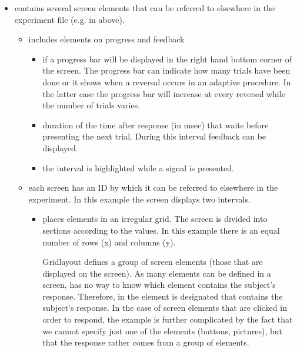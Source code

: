 \begin{itemize}
\item {} contains several screen elements that can
be referred to elsewhere in the experiment file (e.g. in
 above).

\begin{itemize}
\item {} includes elements on progress and
feedback

\begin{itemize}

\item {} if  a progress bar will be
displayed in the right hand bottom corner of the screen. The
progress bar can indicate how many trials have been done or it
shows when a reversal occurs in an adaptive procedure. In the
latter case the progress bar will increase at every reversal while
the number of trials varies.

\item {} duration of the time after
response (in msec) that \apex waits before presenting the next
trial. During this interval feedback can be displayed.

\item {} the interval is highlighted while a
signal is presented.
\end{itemize}

\item {} each screen has an ID by which it can be
referred to elsewhere in the experiment. In this example the
screen displays two intervals.

\begin{itemize}


\item {}places elements in an irregular grid.
The screen is divided into sections according to the values. In
this example there is an equal number of rows (x) and columns (y).

Gridlayout defines a group of screen elements (those that are
displayed on the screen). As many elements can be defined in a
screen, \apex has no way to know which element contains the
subject's response. Therefore, in 
the element is designated that contains the subject's response. In
the case of screen elements that are clicked in order to respond,
the example is further complicated by the fact that we cannot
specify just one of the elements (buttons, pictures), but that the
response rather comes from a group of elements.


\end{itemize}
\end{itemize}
\end{itemize}
